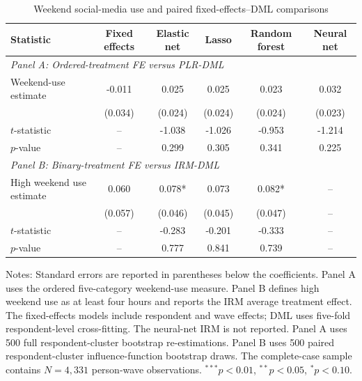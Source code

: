 \begin{table}[!htbp]
\centering
\caption{Weekend social-media use and paired fixed-effects--DML comparisons}
\label{tab:robustness_weekend}
\small
\setlength{\tabcolsep}{5pt}
\begin{tabular*}{\textwidth}{@{\extracolsep{\fill}}lccccc}
\hline
Statistic & Fixed effects & Elastic net & Lasso & Random forest & Neural net
\\
\hline
\multicolumn{6}{l}{\textit{Panel A: Ordered-treatment FE versus PLR-DML}} \\
Weekend-use estimate & -0.011 & 0.025 & 0.025 & 0.023 & 0.032
\\
 & (0.034) & (0.024) & (0.024) & (0.024) & (0.023)
\\
$t$-statistic & -- & -1.038 & -1.026 & -0.953 & -1.214
\\
$p$-value & -- & 0.299 & 0.305 & 0.341 & 0.225
\\[0.5ex]
\multicolumn{6}{l}{\textit{Panel B: Binary-treatment FE versus IRM-DML}} \\
High weekend use estimate & 0.060 & 0.078* & 0.073 & 0.082* & --
\\
 & (0.057) & (0.046) & (0.045) & (0.047) & --
\\
$t$-statistic & -- & -0.283 & -0.201 & -0.333 & --
\\
$p$-value & -- & 0.777 & 0.841 & 0.739 & --
\\
\hline
\end{tabular*}
\begin{minipage}{0.97\textwidth}
\footnotesize Notes: Standard errors are reported in parentheses below the coefficients. Panel A uses the ordered five-category weekend-use measure. Panel B defines high weekend use as at least four hours and reports the IRM average treatment effect. The fixed-effects models include respondent and wave effects; DML uses five-fold respondent-level cross-fitting. The neural-net IRM is not reported. Panel A uses 500 full respondent-cluster bootstrap re-estimations. Panel B uses 500 paired respondent-cluster influence-function bootstrap draws. The complete-case sample contains $N=4,331$ person-wave observations. $^{***}p<0.01$, $^{**}p<0.05$, $^{*}p<0.10$.
\end{minipage}
\end{table}

